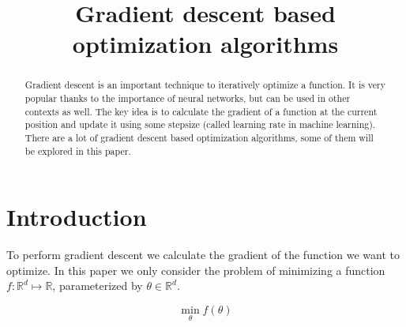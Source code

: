 \documentclass[aodsor,preprint]{imsart}
\numberwithin{equation}{section}
\theoremstyle{plain}
\begin{document}
\begin{frontmatter}
\title{Gradient descent based optimization algorithms}

\begin{aug}
\author{ }





\end{aug}

\begin{abstract}
Gradient descent is an important technique to iteratively optimize a function. It is very popular thanks to the importance of neural networks, but can be used in other contexts as well. The key idea is to calculate the gradient of a function at the current position and update it using some stepsize (called learning rate in machine learning). There are a lot of gradient descent based optimization algorithms, some of them will be explored in this paper. 
\end{abstract}


\end{frontmatter}

\section{Introduction}
To perform gradient descent we calculate the gradient of the function we want to optimize. In this paper we only consider the problem of minimizing a function $f : \mathbb{R}^d \mapsto \mathbb{R}$, parameterized by $\theta \in \mathbb{R}^d$.

\begin{equation} \label{eq:objFunction}
\min_{\theta} f(\theta)
\end{equation}
\end{document}
